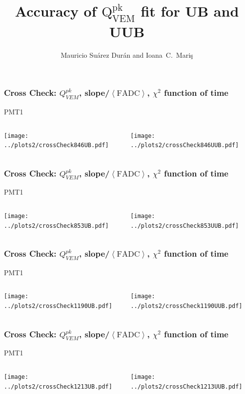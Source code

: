 \documentclass[aspectratio=169]{beamer}
\title{Accuracy of $\mathrm{Q}^{\mathrm{pk}}_{\mathrm{VEM}}$ fit for UB and UUB}
\author{
  Mauricio Su\'arez Dur\'an and Ioana~C.~Mari\c{s}
}
\institute{IIHE-ULB}
\begin{document}
\begin{frame}
  \titlepage
\end{frame}

\begin{frame}
  \frametitle{Cross Check: $Q^{pk}_{VEM}$,
  slope/$\left<\mathrm{FADC}\right>$, $\chi^2$ function of time}
  PMT1
  \vspace{0.5cm}
  \begin{columns}
    \begin{column}{0.5\textwidth}
      \texttt{[image: ../plots2/crossCheck846UB.pdf]}
    \end{column}
    \begin{column}{0.5\textwidth}
      \texttt{[image: ../plots2/crossCheck846UUB.pdf]}
    \end{column}
  \end{columns}
\end{frame}

\begin{frame}
  \frametitle{Cross Check: $Q^{pk}_{VEM}$,
  slope/$\left<\mathrm{FADC}\right>$, $\chi^2$ function of time}
  PMT1
  \vspace{0.5cm}
  \begin{columns}
    \begin{column}{0.5\textwidth}
      \texttt{[image: ../plots2/crossCheck853UB.pdf]}
    \end{column}
    \begin{column}{0.5\textwidth}
      \texttt{[image: ../plots2/crossCheck853UUB.pdf]}
    \end{column}
  \end{columns}
\end{frame}

\begin{frame}
  \frametitle{Cross Check: $Q^{pk}_{VEM}$,
  slope/$\left<\mathrm{FADC}\right>$, $\chi^2$ function of time}
  PMT1
  \vspace{0.5cm}
  \begin{columns}
    \begin{column}{0.5\textwidth}
      \texttt{[image: ../plots2/crossCheck1190UB.pdf]}
    \end{column}
    \begin{column}{0.5\textwidth}
      \texttt{[image: ../plots2/crossCheck1190UUB.pdf]}
    \end{column}
  \end{columns}
\end{frame}

\begin{frame}
  \frametitle{Cross Check: $Q^{pk}_{VEM}$,
  slope/$\left<\mathrm{FADC}\right>$, $\chi^2$ function of time}
  PMT1
  \vspace{0.5cm}
  \begin{columns}
    \begin{column}{0.5\textwidth}
      \texttt{[image: ../plots2/crossCheck1213UB.pdf]}
    \end{column}
    \begin{column}{0.5\textwidth}
      \texttt{[image: ../plots2/crossCheck1213UUB.pdf]}
    \end{column}
  \end{columns}
\end{frame}
\end{document}
